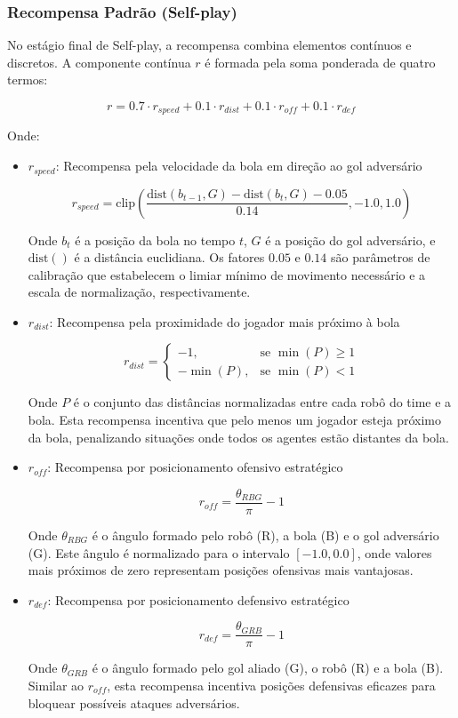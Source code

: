 \subsubsection{Recompensa Padrão (Self-play)}

No estágio final de Self-play, a recompensa combina elementos contínuos e discretos. A componente contínua $r$ é formada pela soma ponderada de quatro termos:

$$r = 0.7 \cdot r_{speed} + 0.1 \cdot r_{dist} + 0.1 \cdot r_{off} + 0.1 \cdot r_{def}$$

Onde:

\begin{itemize}
    \item $r_{speed}$: Recompensa pela velocidade da bola em direção ao gol adversário
    
    $$r_{speed} = \text{clip}\left(\frac{\text{dist}(b_{t-1}, G) - \text{dist}(b_t, G) - 0.05}{0.14}, -1.0, 1.0\right)$$
    
    Onde $b_t$ é a posição da bola no tempo $t$, $G$ é a posição do gol adversário, e $\text{dist}()$ é a distância euclidiana. Os fatores $0.05$ e $0.14$ são parâmetros de calibração que estabelecem o limiar mínimo de movimento necessário e a escala de normalização, respectivamente.
    
    \item $r_{dist}$: Recompensa pela proximidade do jogador mais próximo à bola
    
    $$r_{dist} = 
    \begin{cases}
      -1, & \text{se } \min(P) \geq 1 \\
      -\min(P), & \text{se } \min(P) < 1
    \end{cases}$$
    
    Onde $P$ é o conjunto das distâncias normalizadas entre cada robô do time e a bola. Esta recompensa incentiva que pelo menos um jogador esteja próximo da bola, penalizando situações onde todos os agentes estão distantes da bola.
    
    \item $r_{off}$: Recompensa por posicionamento ofensivo estratégico
    
    $$r_{off} = \frac{\theta_{RBG}}{\pi} - 1$$
    
    Onde $\theta_{RBG}$ é o ângulo formado pelo robô (R), a bola (B) e o gol adversário (G). Este ângulo é normalizado para o intervalo $[-1.0, 0.0]$, onde valores mais próximos de zero representam posições ofensivas mais vantajosas.
    
    \item $r_{def}$: Recompensa por posicionamento defensivo estratégico
    
    $$r_{def} = \frac{\theta_{GRB}}{\pi} - 1$$
    
    Onde $\theta_{GRB}$ é o ângulo formado pelo gol aliado (G), o robô (R) e a bola (B). Similar ao $r_{off}$, esta recompensa incentiva posições defensivas eficazes para bloquear possíveis ataques adversários.
\end{itemize}

